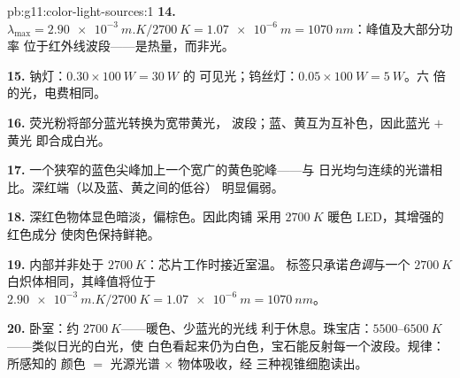 \begin{solution}{pb:g11:color-light-sources:1}
\textbf{14.} $\lambda_{\max} = \qty{2.90e-3}{m.K}/\qty{2700}{K} =
\qty{1.07e-6}{m} = \qty{1070}{nm}$：峰值及大部分功率
位于红外线波段——是热量，而非光。

\textbf{15.} 钠灯：$0.30 \times \qty{100}{W} = \qty{30}{W}$ 的
可见光；钨丝灯：$0.05 \times \qty{100}{W} = \qty{5}{W}$。六
倍的光，电费相同。

\textbf{16.} 荧光粉将部分蓝光转换为宽带黄光，
波段；蓝、黄互为互补色，因此蓝光 $+$ 黄光
即合成白光。

\textbf{17.} 一个狭窄的蓝色尖峰加上一个宽广的黄色驼峰——与
日光均匀连续的光谱相比。深红端（以及蓝、黄之间的低谷）
明显偏弱。

\textbf{18.} 深红色物体显色暗淡，偏棕色。因此肉铺
采用 $\qty{2700}{K}$ 暖色 LED，其增强的红色成分
使肉色保持鲜艳。

\textbf{19.} 内部并非处于 $\qty{2700}{K}$：芯片工作时接近室温。
标签只承诺\emph{色调}与一个
$\qty{2700}{K}$ 白炽体相同，其峰值将位于
$\qty{2.90e-3}{m.K}/\qty{2700}{K} = \qty{1.07e-6}{m} = \qty{1070}{nm}$。

\textbf{20.} 卧室：约 $\qty{2700}{K}$——暖色、少蓝光的光线
利于休息。珠宝店：$5500$--$\qty{6500}{K}$——类似日光的白光，使
白色看起来仍为白色，宝石能反射每一个波段。规律：所感知的
颜色 $=$ 光源光谱 $\times$ 物体吸收，经
三种视锥细胞读出。
\end{solution}
